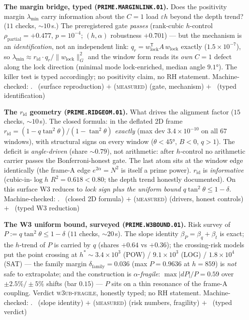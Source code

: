 \documentclass[11pt,a4paper]{article}
\theoremstyle{definition}
\begin{document}
\par\smallskip\noindent\textbf{The margin bridge, typed
(\texttt{PRIME.MARGINLINK.01}).}
Does the positivity margin $\lambda_{\min}$ carry information about
the $C=1$ load $\varepsilon h$ beyond the depth trend? ($11$ checks,
${\sim}10$\,s.)  The preregistered gate \emph{passes} (rank-cubic
$h$-control $\rho_{\mathrm{partial}}=+0.477$, $p=10^{-4}$;
$(h,\alpha)$ robustness $+0.701$) --- but the mechanism is an
\emph{identification}, not an independent link:
$q_r=w_{\mathrm{lock}}^{\mathsf T}\widehat A\,w_{\mathrm{lock}}$
exactly ($1.5\times10^{-7}$), so
$\lambda_{\min}\approx r_{\mathrm{id}}\cdot
q_r/\|w_{\mathrm{lock}}\|^2_G$ and the window form reads its
\emph{own} $C=1$ defect along the lock direction (minimal mode
lock-enriched, median angle $9.1°$).  The killer test is typed
accordingly; no positivity claim, no RH statement.
Machine-checked: .
\mE\ (surface reproduction) $+$ (\textsc{measured}) (gate,
mechanism) $+$ \mC\ (typed identification)
\par\smallskip

\par\smallskip\noindent\textbf{The $r_{\mathrm{id}}$ geometry
(\texttt{PRIME.RIDGEOM.01}).}
What drives the alignment factor ($15$ checks, ${\sim}10$\,s).  The
closed formula: in the deflated 2D frame
$r_{\mathrm{id}}=(1-q\tan^2\theta)/(1-\tan^2\theta)$ \emph{exactly}
(max dev $3.4\times10^{-10}$ on all $67$ windows), with structural
signs on every window ($\theta<45°$, $B<0$, $q>1$).  The deficit is
\emph{angle-driven} (share ${\sim}0.79$), not arithmetic: after
$h$-control no arithmetic carrier passes the Bonferroni-honest gate.
The last atom sits at the window edge identically (the frame-A edge
$e^{2\alpha}=N^2$ is itself a prime power).  $r_{\mathrm{id}}$ is
\emph{informative} (cubic-in-$\log h$ $R^2=0.618<0.80$; the depth
trend honestly documented).  On this surface W3 reduces to
\emph{lock sign plus the uniform bound} $q\tan^2\theta\le1-\delta$.
Machine-checked: .
\mE\ (closed 2D formula) $+$ (\textsc{measured}) (drivers, honest
controls) $+$ \mC\ (typed W3 reduction)
\par\smallskip

\par\smallskip\noindent\textbf{The W3 uniform bound, surveyed
(\texttt{PRIME.W3BOUND.01}).}
Risk survey of $P:=q\tan^2\theta\le1-\delta$ ($11$ checks,
${\sim}20$\,s).  The slope identity $\beta_P=\beta_q+\beta_t$ is
exact; the $h$-trend of $P$ is carried by $q$ (shares $+0.64$ vs
$+0.36$); the crossing-risk models put the point crossing at
$h^*\sim3.4\times10^3$ (POW) / $9.1\times10^3$ (LOG) /
$1.8\times10^4$ (SAT) --- the family margin
$\delta_{\mathrm{family}}=0.036$ (max $P=0.9636$ at $h=859$) is
\emph{not} safe to extrapolate; and the construction is
$\alpha$-\emph{fragile}: $\max|dP|/P=0.59$ over
$\pm2.5\%/\pm5\%$ shifts (bar $0.15$) --- $P$ sits on a thin
resonance of the frame-A coupling.  Verdict
\textsc{w3ub-fragile}, honestly typed; no RH statement.
Machine-checked: .
\mE\ (slope identity) $+$ (\textsc{measured}) (risk numbers,
fragility) $+$ \mC\ (typed verdict)
\par\smallskip
\end{document}
